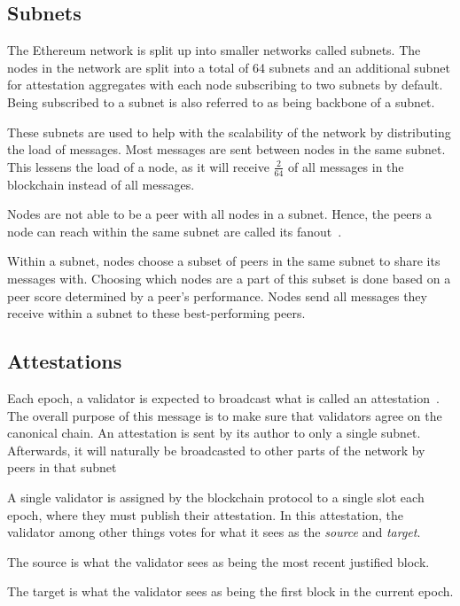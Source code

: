 \subsection{Subnets}\label{subsec:subnets}
The Ethereum network is split up into smaller networks called subnets.
The nodes in the network are split into a total of 64 subnets and an additional subnet for attestation aggregates with each node subscribing to two subnets by default.
Being subscribed to a subnet is also referred to as being backbone of a subnet.

These subnets are used to help with the scalability of the network by distributing the load of messages.
Most messages are sent between nodes in the same subnet.
This lessens the load of a node, as it will receive $\frac{2}{64}$ of all messages in the blockchain instead of all messages.


Nodes are not able to be a peer with all nodes in a subnet.
Hence, the peers a node can reach within the same subnet are called its fanout~\cite{heimbach2024deanonymizingethereumvalidatorsp2p}.

Within a subnet, nodes choose a subset of peers in the same subnet to share its messages with.
Choosing which nodes are a part of this subset is done based on a peer score determined by a peer's performance.
Nodes send all messages they receive within a subnet to these best-performing peers.

\subsection{Attestations}\label{subsec:attestations}
Each epoch, a validator is expected to broadcast what is called an attestation~\cite{attestations}.
The overall purpose of this message is to make sure that validators agree on the canonical chain.
An attestation is sent by its author to only a single subnet.
Afterwards, it will naturally be broadcasted to other parts of the network by peers in that subnet

A single validator is assigned by the blockchain protocol to a single slot each epoch, where they must publish their attestation.
In this attestation, the validator among other things votes for what it sees as the \textit{source} and \textit{target}.

The source is what the validator sees as being the most recent justified block.

The target is what the validator sees as being the first block in the current epoch.

